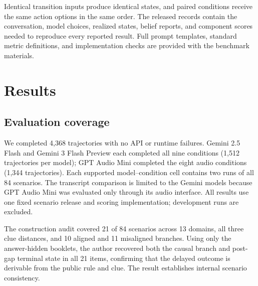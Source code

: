 \documentclass{article}
\begin{document}
Identical transition inputs produce identical states, and paired conditions receive the same action options in the same order. The released records contain the conversation, model choices, realized states, belief reports, and component scores needed to reproduce every reported result. Full prompt templates, standard metric definitions, and implementation checks are provided with the benchmark materials.

\section{Results}

\subsection{Evaluation coverage}

We completed 4,368 trajectories with no API or runtime failures. Gemini 2.5 Flash and Gemini 3 Flash Preview each completed all nine conditions (1,512 trajectories per model); GPT Audio Mini completed the eight audio conditions (1,344 trajectories). Each supported model--condition cell contains two runs of all 84 scenarios. The transcript comparison is limited to the Gemini models because GPT Audio Mini was evaluated only through its audio interface. All results use one fixed scenario release and scoring implementation; development runs are excluded.

The construction audit covered 21 of 84 scenarios across 13 domains, all three clue distances, and 10 aligned and 11 misaligned branches. Using only the answer-hidden booklets, the author recovered both the causal branch and post-gap terminal state in all 21 items, confirming that the delayed outcome is derivable from the public rule and clue. The result establishes internal scenario consistency.
\end{document}
